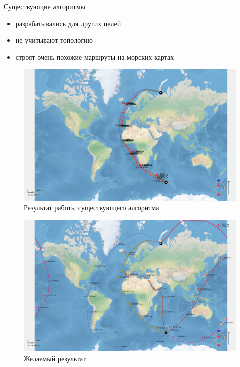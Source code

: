 \documentclass[mathserif]{beamer}
\begin{document}
\begin{frame}{Существующие алгоритмы}
    \begin{itemize}
        \item<1-3> разрабатывались для других целей
        \item<2-3> не учитывают топологию
        \item<3-3> строят очень похожие маршруты на морских картах
    \end{itemize}
     {
        \begin{figure}
            \includegraphics[width=\textwidth]{comparison-with-existing-bad}
            \caption{Результат работы существующего алгоритма}
        \end{figure}
    }
     {
        \begin{figure}
            \includegraphics[width=\textwidth]{comparison-with-existing-good}
            \caption{Желаемый результат}
        \end{figure}
    }
\end{frame}
\end{document}
